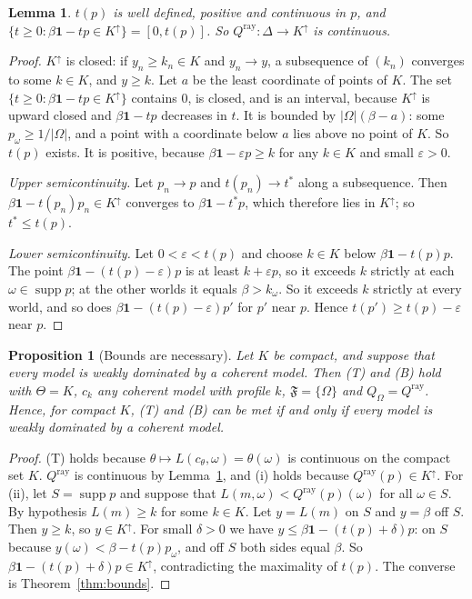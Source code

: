 \documentclass[11pt]{article}
\newtheorem{lemma}[theorem]{Lemma}
\newtheorem{proposition}[theorem]{Proposition}
\theoremstyle{definition}
\theoremstyle{remark}
\newcommand{\F}{\mathfrak F}
\newcommand{\one}{\mathbf 1}
\newcommand{\supp}{\operatorname{supp}}
\begin{document}
\begin{lemma}\label{lem:ray}
$t(p)$ is well defined, positive and continuous in $p$, and $\{t\ge0:\beta\one-tp\in K^\uparrow\}=[0,t(p)]$. So $Q^{\mathrm{ray}}:\Delta\to K^\uparrow$ is continuous.
\end{lemma}
\begin{proof}
$K^\uparrow$ is closed: if $y_n\ge k_n\in K$ and $y_n\to y$, a subsequence of $(k_n)$ converges to some $k\in K$, and $y\ge k$. Let $a$ be the least coordinate of points of $K$. The set $\{t\ge0:\beta\one-tp\in K^\uparrow\}$ contains $0$, is closed, and is an interval, because $K^\uparrow$ is upward closed and $\beta\one-tp$ decreases in $t$. It is bounded by $|\Omega|(\beta-a)$: some $p_\omega\ge1/|\Omega|$, and a point with a coordinate below $a$ lies above no point of $K$. So $t(p)$ exists. It is positive, because $\beta\one-\varepsilon p\ge k$ for any $k\in K$ and small $\varepsilon>0$.

\emph{Upper semicontinuity.} Let $p_n\to p$ and $t(p_n)\to t^*$ along a subsequence. Then $\beta\one-t(p_n)p_n\in K^\uparrow$ converges to $\beta\one-t^*p$, which therefore lies in $K^\uparrow$; so $t^*\le t(p)$.

\emph{Lower semicontinuity.} Let $0<\varepsilon<t(p)$ and choose $k\in K$ below $\beta\one-t(p)p$. The point $\beta\one-(t(p)-\varepsilon)p$ is at least $k+\varepsilon p$, so it exceeds $k$ strictly at each $\omega\in\supp p$; at the other worlds it equals $\beta>k_\omega$. So it exceeds $k$ strictly at every world, and so does $\beta\one-(t(p)-\varepsilon)p'$ for $p'$ near $p$. Hence $t(p')\ge t(p)-\varepsilon$ near $p$.
\end{proof}

\begin{proposition}[Bounds are necessary]\label{prop:necessary}
Let $K$ be compact, and suppose that every model is weakly dominated by a coherent model. Then (T) and (B) hold with $\Theta=K$, $c_k$ any coherent model with profile $k$, $\F=\{\Omega\}$ and $Q_\Omega=Q^{\mathrm{ray}}$. Hence, for compact $K$, (T) and (B) can be met if and only if every model is weakly dominated by a coherent model.
\end{proposition}
\begin{proof}
(T) holds because $\theta\mapsto L(c_\theta,\omega)=\theta(\omega)$ is continuous on the compact set $K$. $Q^{\mathrm{ray}}$ is continuous by Lemma~\ref{lem:ray}, and (i) holds because $Q^{\mathrm{ray}}(p)\in K^\uparrow$. For (ii), let $S=\supp p$ and suppose that $L(m,\omega)<Q^{\mathrm{ray}}(p)(\omega)$ for all $\omega\in S$. By hypothesis $L(m)\ge k$ for some $k\in K$. Let $y=L(m)$ on $S$ and $y=\beta$ off $S$. Then $y\ge k$, so $y\in K^\uparrow$. For small $\delta>0$ we have $y\le \beta\one-(t(p)+\delta)p$: on $S$ because $y(\omega)<\beta-t(p)p_\omega$, and off $S$ both sides equal $\beta$. So $\beta\one-(t(p)+\delta)p\in K^\uparrow$, contradicting the maximality of $t(p)$. The converse is Theorem~\ref{thm:bounds}.
\end{proof}
\end{document}
